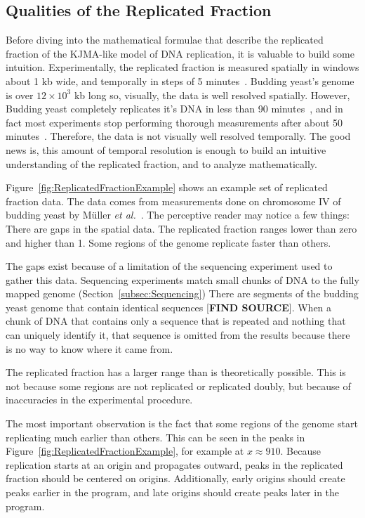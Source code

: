 	
		\subsection{Qualities of the Replicated Fraction}
		\label{subsec:QualitiesReplicatedFraction}
		
		Before diving into the mathematical formulae that describe the replicated fraction of the KJMA-like model of DNA replication, it is valuable to build some intuition.
		Experimentally, the replicated fraction is measured spatially in windows about 1 kb wide, and temporally in steps of 5 minutes~\cite{StochasticTermination}.
		Budding yeast's genome is over $12\times10^3$ kb long so, visually, the data is well resolved spatially.
		However, Budding yeast completely replicates it's DNA in less than 90 minutes~\cite{DeepSeq}, and in fact most experiments stop performing thorough measurements after about 50 minutes~\cite{DeepSeq,StochasticTermination,McCuneMicroArray}.
		Therefore, the data is not visually well resolved temporally.
		The good news is, this amount of temporal resolution is enough to build an intuitive understanding of the replicated fraction, and to analyze mathematically.
		
		Figure~\ref{fig:ReplicatedFractionExample} shows an example set of replicated fraction data.
		The data comes from measurements done on chromosome IV of budding yeast by M{\"u}ller \emph{et al.}~\cite{DeepSeq}.
		The perceptive reader may notice a few things:
		There are gaps in the spatial data.
		The replicated fraction ranges lower than zero and higher than 1.
		Some regions of the genome replicate faster than others.
		
		The gaps exist because of a limitation of the sequencing experiment used to gather this data.
		Sequencing experiments match small chunks of DNA to the fully mapped genome (Section~\ref{subsec:Sequencing})
		There are segments of the budding yeast genome that contain identical sequences [\textbf{FIND SOURCE}].
		When a chunk of DNA that contains only a sequence that is repeated and nothing that can uniquely identify it, that sequence is omitted from the results because there is no way to know where it came from.
		
		The replicated fraction has a larger range than is theoretically possible.
		This is not because some regions are not replicated or replicated doubly, but because of inaccuracies in the experimental procedure.
		
		The most important observation is the fact that some regions of the genome start replicating much earlier than others.
		This can be seen in the peaks in Figure~\ref{fig:ReplicatedFractionExample}, for example at $x \approx 910$.
		Because replication starts at an origin and propagates outward, peaks in the replicated fraction should be centered on origins.
		Additionally, early origins should create peaks earlier in the program, and late origins should create peaks later in the program.
		
